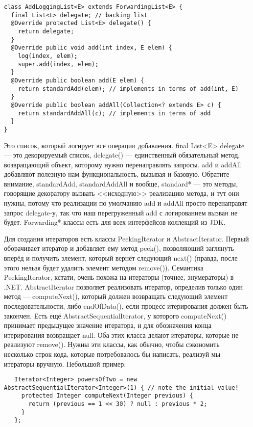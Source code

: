 \documentclass[a5paper,draft]{article}
\begin{document}
\begin{verbatim}
class AddLoggingList<E> extends ForwardingList<E> {
  final List<E> delegate; // backing list
  @Override protected List<E> delegate() {
    return delegate;
  }
  @Override public void add(int index, E elem) {
    log(index, elem);
    super.add(index, elem);
  }
  @Override public boolean add(E elem) {
    return standardAdd(elem); // implements in terms of add(int, E)
  }
  @Override public boolean addAll(Collection<? extends E> c) {
    return standardAddAll(c); // implements in terms of add
  }
}
\end{verbatim}

Это список, который логирует все операции добавления. final List<E> delegate --- это декорируемый список, delegate() --- единственный обязательный метод, возвращающий объект, которому нужно перенаправлять запросы. add и addAll добавляют полезную нам функциональность, вызывая и базовую. Обратите внимание, standardAdd, standardAddAll и вообще, standard* --- это методы, говорящие декоратору вызвать <<исходную>> реализацию метода, и тут они нужны, потому что реализации по умолчанию add и addAll просто перенаправят запрос delegate-у, так что наш перегруженный add с логированием вызван не будет. Forwarding*-классы есть для всех интерфейсов коллекций из JDK.

Для создания итераторов есть классы PeekingIterator и AbstractIterator. Первый оборачивает итератор и добавляет ему метод peek(), позволяющий заглянуть вперёд и получить элемент, который вернёт следующий next() (правда, после этого нельзя будет удалить элемент методом remove()). Семантика PeekingIterator, кстати, очень похожа на итераторы (точнее, энумераторы) в .NET. AbstractIterator позволяет реализовать итератор, определив только один метод --- computeNext(), который должен возвращать следующий элемент последовательности, либо endOfData(), если процесс итерирования должен быть закончен. Есть ещё AbstractSequentialIterator, у которого computeNext() принимает предыдущее значение итератора, и для обозначения конца итерирования возвращает null. Оба этих класса делают итераторы, которые не реализуют remove(). Нужны эти классы, как обычно, чтобы сэкономить несколько строк кода, которые потребовалось бы написать, реализуй мы итераторы вручную. Небольшой пример:

\begin{verbatim}
   Iterator<Integer> powersOfTwo = new AbstractSequentialIterator<Integer>(1) { // note the initial value!
     protected Integer computeNext(Integer previous) {
       return (previous == 1 << 30) ? null : previous * 2;
     }
   };
\end{verbatim}
\end{document}
